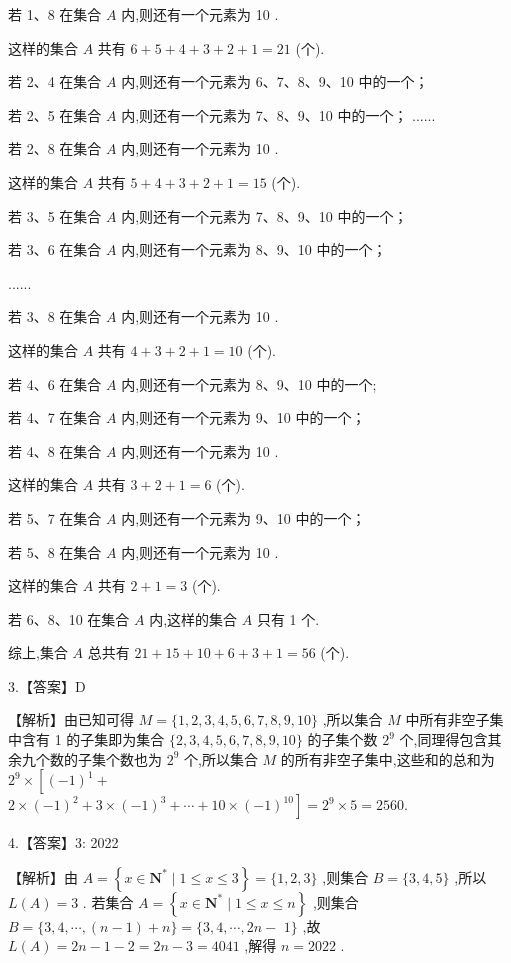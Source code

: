 \documentclass[10pt]{article}
\begin{document}
若 1、8 在集合 $A$ 内,则还有一个元素为 10 .

这样的集合 $A$ 共有 $6 + 5 + 4 + 3 + 2 + 1 = {21}$ (个).

若 2、4 在集合 $A$ 内,则还有一个元素为 6、7、8、9、10 中的一个；

若 2、5 在集合 $A$ 内,则还有一个元素为 7、8、9、10 中的一个； ......

若 2、8 在集合 $A$ 内,则还有一个元素为 10 .

这样的集合 $A$ 共有 $5 + 4 + 3 + 2 + 1 = {15}$ (个).

若 3、5 在集合 $A$ 内,则还有一个元素为 7、8、9、10 中的一个；

若 3、6 在集合 $A$ 内,则还有一个元素为 8、9、10 中的一个；

......

若 3、8 在集合 $A$ 内,则还有一个元素为 10 .

这样的集合 $A$ 共有 $4 + 3 + 2 + 1 = {10}$ (个).

若 4、6 在集合 $A$ 内,则还有一个元素为 8、9、10 中的一个;

若 4、7 在集合 $A$ 内,则还有一个元素为 9、10 中的一个；

若 4、8 在集合 $A$ 内,则还有一个元素为 10 .

这样的集合 $A$ 共有 $3 + 2 + 1 = 6$ (个).

若 5、7 在集合 $A$ 内,则还有一个元素为 9、10 中的一个；

若 5、8 在集合 $A$ 内,则还有一个元素为 10 .

这样的集合 $A$ 共有 $2 + 1 = 3$ (个).

若 6、8、10 在集合 $A$ 内,这样的集合 $A$ 只有 1 个.

综上,集合 $A$ 总共有 ${21} + {15} + {10} + 6 + 3 + 1 = {56}$ (个).

3.【答案】D

【解析】由已知可得 $M = \{ 1,2,3,4,5,6,7,8,9,{10}\}$ ,所以集合 $M$ 中所有非空子集中含有 1 的子集即为集合 $\{ 2,3,4,5,6,7,8,9,{10}\}$ 的子集个数 ${2}^{9}$ 个,同理得包含其余九个数的子集个数也为 ${2}^{9}$ 个,所以集合 $M$ 的所有非空子集中,这些和的总和为 ${2}^{9} \times  \left\lbrack  {{\left( -1\right) }^{1} + }\right.$  $\left. {2 \times  {\left( -1\right) }^{2} + 3 \times  {\left( -1\right) }^{3} + \cdots  + {10} \times  {\left( -1\right) }^{10}}\right\rbrack   = {2}^{9} \times  5 = {2560}.$

4.【答案】3: 2022

【解析】由 $A = \left\{  {x \in  {\mathbf{N}}^{ * } \mid  1 \leq  x \leq  3}\right\}   = \{ 1,2,3\}$ ,则集合 $B = \{ 3,4,5\}$ ,所以 $L\left( A\right)  = 3$ . 若集合 $A = \left\{  {x \in  {\mathbf{N}}^{ * } \mid  1 \leq  x \leq  n}\right\}$ ,则集合 $B = \{ 3,4,\cdots ,\left( {n - 1}\right)  + n\}  = \{ 3,4,\cdots ,{2n} -$  $1\}$ ,故 $L\left( A\right)  = {2n} - 1 - 2 = {2n} - 3 = {4041}$ ,解得 $n = {2022}$ .
\end{document}
